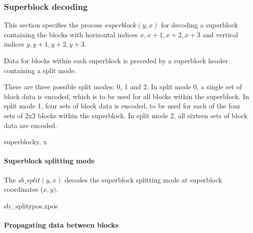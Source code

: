 \subsubsection{Superblock decoding}

\label{superblockdecoding}

This section specifies the process $superblock(y, x)$ for decoding a superblock containing
the blocks with horizontal indices $x, x+1, x+2, x+3$ and vertical indices $y, y+1, y+2, y+3$.

Data for blocks within each superblock is preceded by a superblock header containing
a split mode.

There are three possible split modes: 0, 1 and 2. In split mode 0, a single set of block data is encoded, 
which is to be used for all blocks within
the superblock. In split mode 1, four sets of block data is encoded, to be used for each of the four
sets of 2x2 blocks within the superblock. In split mode 2, all sixteen sets of block data are encoded.

\begin{pseudo}{superblock}{y, x}
   \bsEND
\bsEND
\end{pseudo}

\paragraph{Superblock splitting mode}
\label{superblocksplit}

The $sb\_split(y, x)$ decodes the superblock splitting mode at superblock coordinates ($x, y)$.

\begin{pseudo}{sb\_split}{ypos,xpos}
\end{pseudo}

\paragraph{Propagating data between blocks}
\label{propagatedata}

